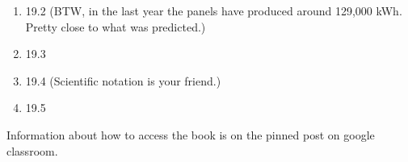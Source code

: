 \documentclass[12pt]{article}
\begin{document}
\begin{enumerate}
  \setlength{\itemsep}{-1mm}
\item 19.2 (BTW, in the last year the panels have produced around 129,000 kWh. Pretty
  close to what was predicted.)
\item 19.3
\item 19.4 (Scientific notation is your friend.)
\item 19.5
\end{enumerate}



\noindent Information about how to access the book is on the
pinned post on google classroom. 
\end{document}
